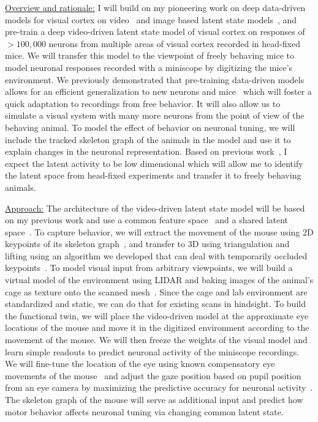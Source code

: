 \documentclass[COG,11pt]{ercgrant}
\begin{document}
\underline{Overview and rationale:}
I will build on my pioneering work on deep data-driven models for visual cortex on video~\parencite{Sinz2018-sk} and image based latent state models~\parencite{Bashiri2021-or}, and pre-train a deep video-driven latent state model of visual cortex on responses of $>100,000$ neurons from multiple areas of visual cortex recorded in head-fixed mice.
We will transfer this model to the viewpoint of freely behaving mice to model neuronal responses recorded with a miniscope by digitizing the mice's environment. 
We previously demonstrated that pre-training data-driven models allows for an efficient generalization to new neurons and mice~\parencite{Lurz2020-ua} which will foster a quick adaptation to recordings from free behavior. 
It will also allow us to simulate a visual system with many more neurons from the point of view of the behaving animal.
To model the effect of behavior on neuronal tuning, we will include the tracked skeleton graph of the animals in the model and use it to explain changes in the neuronal representation.
Based on previous work~\parencite{Musall2019-kd, Stringer2019-lt}, I expect the latent activity to be low dimensional which will allow me to identify the latent space from head-fixed experiments and transfer it to freely behaving animals. 

\underline{Approach:} 
The architecture of the video-driven latent state model will be based on my previous work and use a common feature space~\parencite{Sinz2018-sk} and a shared latent space~\parencite{Bashiri2021-or}. 
To capture behavior, we will extract the movement of the mouse using 2D keypoints of its skeleton graph~\parencite{Mathis2018-lk}, and transfer to 3D using triangulation and lifting  using an algorithm we developed that can deal with temporarily occluded keypoints~\parencite{Pierzchlewicz2022-tq}. 
To model visual input from arbitrary viewpoints, we will build a virtual model of the environment using LIDAR and baking images of the animal's cage as texture onto the scanned mesh~\parencite[similar as in][]{Holmgren2021-jv}. 
Since the cage and lab environment are standardized and static, we can do that for existing scans in hindsight.
To build the functional twin, we will place the video-driven model at the approximate eye locations of the mouse and move it in the digitized environment according to the movement of the mouse. 
We will then freeze the weights of the visual model and learn simple readouts to predict neuronal activity of the miniscope recordings.
We will fine-tune the location of the eye using known compensatory eye movements of the mouse~\parencite{Wallace2013-lf} and adjust the gaze position based on pupil position from an eye camera by maximizing the predictive accuracy for neuronal activity~\parencite[similar to][]{Sinz2018-sk, Parker2022-ac}.
The skeleton graph of the mouse will serve as additional input and predict how motor behavior affects neuronal tuning via changing common latent state. 
\end{document}
